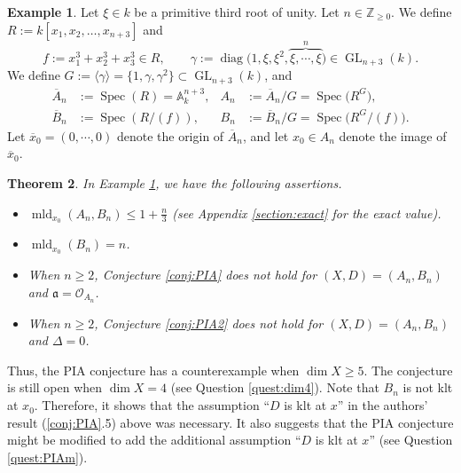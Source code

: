 \documentclass[a4paper,11pt]{amsart}
\newtheorem{thm}{Theorem}[section]
\theoremstyle{definition}
\newtheorem{eg}[thm]{Example}
\theoremstyle{remark}
\begin{document}
\begin{eg}\label{eg:main}
Let $\xi \in k$ be a primitive third root of unity. 
Let $n \in \mathbb{Z}_{\ge 0}$.
We define $R := k[x_1, x_2, \ldots , x_{n+3}]$ and 
\[
f := x_1 ^3 + x_2 ^3 + x_3 ^3 \in R, \qquad
\gamma := \operatorname{diag} \bigl( 1, \xi, \xi^2, \overbrace{\xi , \cdots , \xi}^{n} \bigr) \in \operatorname{GL}_{n+3}(k). 
\] 
We define $G := \langle \gamma \rangle = \{ 1, \gamma , \gamma^2 \} \subset \operatorname{GL}_{n+3}(k)$, and 
\begin{align*}
\overline{A}_n &:= \operatorname{Spec}(R) = \mathbb{A}^{n+3}_k, & A_n&:= \overline{A}_n/G = \operatorname{Spec}\bigl( R^G \bigr), \\
\overline{B}_n &:= \operatorname{Spec}(R/(f)), & B_n&:= \overline{B}_n/G = \operatorname{Spec} \bigl( R^G/(f) \bigr). 
\end{align*}
Let $\overline{x}_0 = (0, \cdots, 0)$ denote the origin of $\overline{A}_n$, 
and let $x_0 \in A_n$ denote the image of $\overline{x}_0$. 
\end{eg}

\begin{thm}\label{thm:main}
In Example \ref{eg:main}, we have the following assertions. 
\begin{itemize}
\item[(1)] $\operatorname{mld}_{x_0}(A_n, B_n)  \le 1 + \frac{n}{3}$ (see Appendix \ref{section:exact} for the exact value). 
\item[(2)] $\operatorname{mld}_{x_0}(B_n)  = n$. 
\item[(3)] When $n \ge 2$, 
Conjecture \ref{conj:PIA} does not hold for $(X, D) = (A_n, B_n)$ and $\mathfrak{a} = \mathcal{O}_{A_n}$. 

\item[(3')] When $n \ge 2$, Conjecture \ref{conj:PIA2} does not hold for $(X, D) = (A_n, B_n)$ and $\Delta = 0$.
\end{itemize}
\end{thm}
Thus, the PIA conjecture has a counterexample when $\dim X \ge 5$. 
The conjecture is still open when $\dim X = 4$ (see  Question \ref{quest:dim4}). 
Note that $B_n$ is not klt at $x_0$. 
Therefore, it shows that the assumption ``$D$ is klt at $x$'' in the authors' result (\ref{conj:PIA}.5) above was necessary.  
It also suggests that the PIA conjecture might be modified to add the additional assumption ``$D$ is klt at $x$'' (see Question \ref{quest:PIAm}). 
\end{document}
